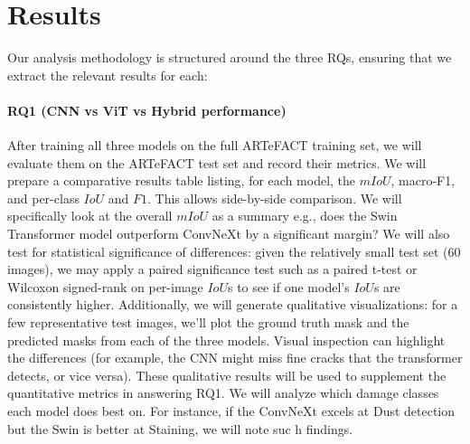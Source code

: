 \documentclass[conference]{IEEEtran}
\begin{document}
\section{Results}
\label{sec:Results}

Our analysis methodology is structured around the three RQs, ensuring that we extract the relevant results for each:

\paragraph*{RQ1 (CNN vs ViT vs Hybrid performance)} After training all three models on the full ARTeFACT training set, we will evaluate them on the ARTeFACT test set and record their metrics. We will prepare a comparative results table listing, for each model, the $mIoU$, macro-F1, and per-class $IoU$ and $F1$. This allows side-by-side comparison. We will specifically look at the overall $mIoU$ as a summary e.g., does the Swin Transformer model outperform ConvNeXt by a significant margin? We will also test for statistical significance of differences: given the relatively small test set (60 images), we may apply a paired significance test such as a paired t-test or Wilcoxon signed-rank on per-image $IoU$s to see if one model's $IoU$s are consistently higher.
Additionally, we will generate qualitative visualizations: for a few representative test images, we'll plot the ground truth mask and the predicted masks from each of the three models. Visual inspection can highlight the differences (for example, the CNN might miss fine cracks that the transformer detects, or vice versa). These qualitative results will be used to supplement the quantitative metrics in answering RQ1. We will analyze which damage classes each model does best on. For instance, if the ConvNeXt excels at Dust detection but the Swin is better at Staining, we will note suc
h findings.
\end{document}
